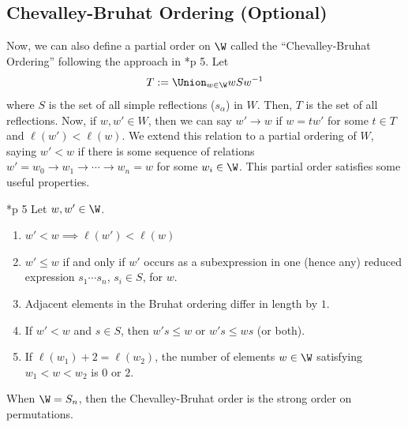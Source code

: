 \documentclass[11pt,leqno,oneside]{amsart}
\numberwithin{thm}{section}
\begin{document}
\subsection{Chevalley-Bruhat Ordering (Optional)}
Now, we can also define a partial order on $\W$ called the
``Chevalley-Bruhat Ordering'' following the approach in
\cite{cat-o}*{p 5}. Let \[
  T := \Union_{w \in \W} wSw^{-1}
\]
where $S$ is the set of all simple reflections ($s_\alpha$) in
$W$. Then, $T$ is the set of all reflections. Now, if $w,w' \in W$,
then we can say $w' \to w$ if $w = tw'$ for some $t \in T$ and $\ell(w') <
\ell(w)$. We extend this relation to a partial ordering of $W$, saying
$w' < w$ if
there is some sequence of relations $w'=w_0 \to w_1 \to \cdots \to
w_n=w$ for some $w_i \in \W$. This partial order satisfies some
useful properties.
\begin{prop}
  \cite{cat-o}*{p 5} Let $w,w' \in \W$.
  \begin{enumerate}
  \item \(w' < w \implies \ell(w') < \ell(w)\)
  \item \(w' \leq w\) if and only if \(w'\) occurs as a subexpression
    in one (hence any) reduced expression \(s_1 \cdots s_n\), \(s_i \in
    S\), for \(w\).
  \item Adjacent elements in the Bruhat ordering differ in length by
    \(1\).
  \item If \(w' < w\) and \(s \in S\), then \(w's \leq w\) or \(w's
    \leq ws\) (or both).
  \item If \(\ell(w_1)+2 = \ell(w_2)\), the number of elements \(w \in
    \W\) satisfying \(w_1 < w < w_2\) is \(0\) or \(2\).
  \end{enumerate}
\end{prop}
\begin{rmk}
  When \(\W = S_n\), then the Chevalley-Bruhat order is the strong order
  on permutations.
\end{rmk}
\end{document}
